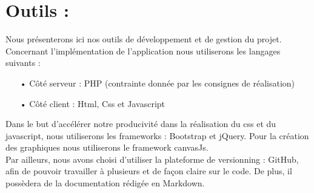 \section{Outils :}

Nous présenterons ici nos outils de développement et de gestion du projet. Concernant l'implémentation de l'application nous utiliserons les langages suivants :\\
\begin{enumerate}
\item[•] Côté serveur : PHP (contrainte donnée par les consignes de réalisation)
\item[•] Côté client : Html, Css et Javascript
\end{enumerate}
Dans le but d'accélérer notre producivité dans la réalisation du css et du javascript, nous utiliserons les frameworks : Bootstrap et jQuery. Pour la création des graphiques nous utiliserons le framework canvasJs. \\

Par ailleurs, nous avons choisi d'utiliser la plateforme de versionning : GitHub, afin de pouvoir travailler à plusieurs et de façon claire sur le code. De plus, il possèdera de la documentation rédigée en Markdown.